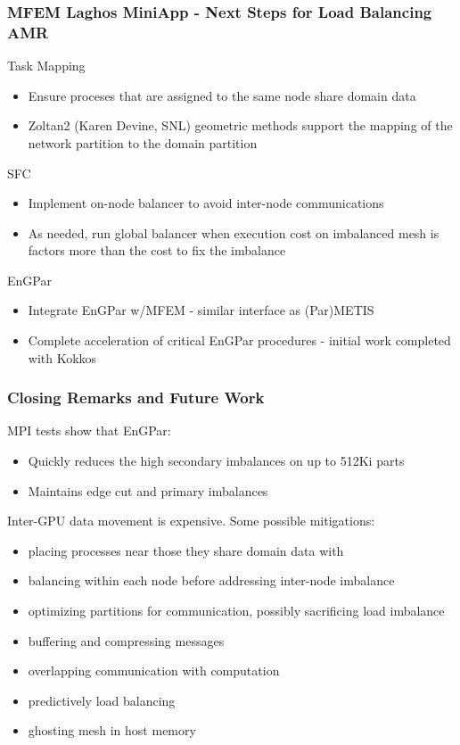 \documentclass[aspectratio=169]{beamer}
\begin{document}
\begin{frame}

  \frametitle{MFEM Laghos MiniApp - Next Steps for Load Balancing AMR}
  Task Mapping
  \begin{itemize}
    \item Ensure proceses that are assigned to the same node share domain data
    \item Zoltan2 (Karen Devine, SNL) geometric methods support the mapping of
      the network partition to the domain partition
  \end{itemize}
  SFC
  \begin{itemize}
    \item Implement on-node balancer to avoid inter-node communications
    \item As needed, run global balancer when execution cost on
      imbalanced mesh is factors more than the cost to fix the imbalance
  \end{itemize}
  EnGPar
  \begin{itemize}
    \item Integrate EnGPar w/MFEM - similar interface as (Par)METIS
    \item Complete acceleration of critical EnGPar procedures - initial work
      completed with Kokkos
  \end{itemize}
\end{frame}

\begin{frame}
  \frametitle{Closing Remarks and Future Work}
  MPI tests show that EnGPar:
  \begin{itemize}
    \item Quickly reduces the high secondary imbalances on up to 512Ki parts
    \item Maintains edge cut and primary imbalances
  \end{itemize}
  Inter-GPU data movement is expensive. Some possible mitigations:
  \begin{itemize}
    \item placing processes near those they share domain data with
    \item balancing within each node before addressing inter-node imbalance
    \item optimizing partitions for communication, possibly sacrificing load imbalance
    \item buffering and compressing messages
    \item overlapping communication with computation
    \item predictively load balancing
    \item ghosting mesh in host memory
  \end{itemize}
\end{frame}
\end{document}
